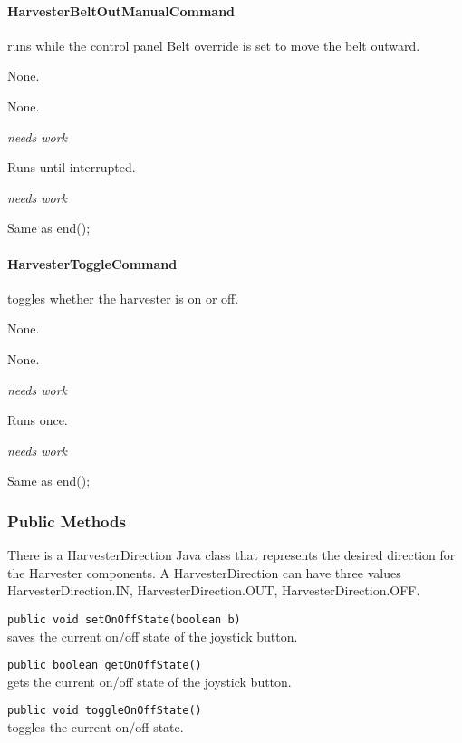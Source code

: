 \documentclass[]{article}
\begin{document}
\paragraph{HarvesterBeltOutManualCommand} runs while the control panel Belt override is set to move the belt outward.
\begin{description}[topsep=0ex]
\item[requires] None.
\item[initialization]  None.
\item[execute] \emph{needs work}
\item[isDone] Runs until interrupted.
\item[end] \emph{needs work}
\item[interrupted] Same as end();
\end{description}

\paragraph{HarvesterToggleCommand} toggles whether the harvester is on or off.
\begin{description}[topsep=0ex]
\item[requires] None.
\item[initialization]  None.
\item[execute] \emph{needs work}
\item[isDone] Runs once.
\item[end] \emph{needs work}
\item[interrupted] Same as end();
\end{description}

\subsubsection{Public Methods}

There is a HarvesterDirection Java class that represents the desired direction for the Harvester components.
A HarvesterDirection can have three values HarvesterDirection.IN, HarvesterDirection.OUT, HarvesterDirection.OFF.

\noindent
\lstinline[]|public void setOnOffState(boolean b)| \\
saves the current on/off state of the joystick button.

\noindent
\lstinline[]|public boolean getOnOffState()| \\
gets the current on/off state of the joystick button.

\noindent
\lstinline[]|public void toggleOnOffState()| \\
toggles the current on/off state.
\end{document}
